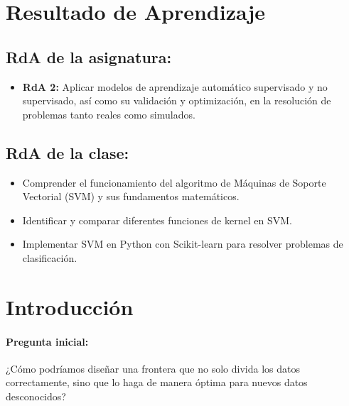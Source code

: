 \documentclass[a4,11pt]{aleph-notas}
\begin{document}
\encabezado

\section*{Resultado de Aprendizaje}

\subsection*{RdA de la asignatura:}
\begin{itemize}[leftmargin=*]
    \item \textbf{RdA 2:} Aplicar modelos de aprendizaje automático supervisado y no supervisado, así como su validación y optimización, en la resolución de problemas tanto reales como simulados.
\end{itemize}

\subsection*{RdA de la clase:}
\begin{itemize}[leftmargin=*]
    \item Comprender el funcionamiento del algoritmo de Máquinas de Soporte Vectorial (SVM) y sus fundamentos matemáticos.
    \item Identificar y comparar diferentes funciones de kernel en SVM.
    \item Implementar SVM en Python con Scikit-learn para resolver problemas de clasificación.
\end{itemize}

\section*{Introducción}

\paragraph{Pregunta inicial:}
¿Cómo podríamos diseñar una frontera que no solo divida los datos correctamente, sino que lo haga de manera óptima para nuevos datos desconocidos?
\end{document}
